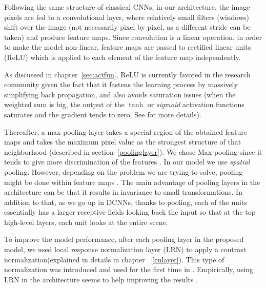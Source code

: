 Following the same structure of classical CNNs, in our architecture, the image pixels are fed to a convolutional layer, where relatively small filters (windows) shift over the image (not necessarily pixel by pixel, as a different stride can be taken) and produce feature maps. Since convolution is a linear operation, in order to make the model non-linear, feature maps are passed to rectified linear units (ReLU) \cite{nair2010rectified} which is applied to each element of the feature map independently. 

As discussed in chapter~\ref{sec:actfun}, ReLU is currently favored in the research community given the fact that it fastens the learning process by massively simplifying back propagation, and also avoids saturation issues (when the weighted sum is big, the output of the $\tanh$ or \textit{sigmoid} activation functions saturates and the gradient tends to zero. See \cite{hansen1990neural, amit1987statistical} for more details). 

\indent Thereafter, a max-pooling layer takes a special region of the obtained feature maps and takes the maximum pixel value as the strongest structure of that neighborhood (described in section~\ref{poolinglayer}). We chose Max-pooling since it tends to give more discrimination of the features \cite{boureau2010theoretical}. In our model we use \textit{spatial} pooling. However, depending on the problem we are trying to solve, pooling might be done within feature maps \cite{goodfellow2013maxout}. The main advantage of pooling layers in the architecture can be that it results in invariance to small transformations. In addition to that, as we go up in DCNNs, thanks to pooling, each of the units essentially has a larger receptive fields looking back the input so that at the top high-level layers, each unit looks at the entire scene.  

To improve the model performance, after each pooling layer in the proposed model, we used local response normalization layer (LRN) to apply a contrast normalization(explained in details in chapter ~\ref{lrnlayer}). This type of normalization was introduced and used for the first time in \cite{krizhevsky2012imagenet}. Empirically, using LRN in the architecture seems to help improving the results \cite{jarrett2009best, krizhevsky2012imagenet}. 



